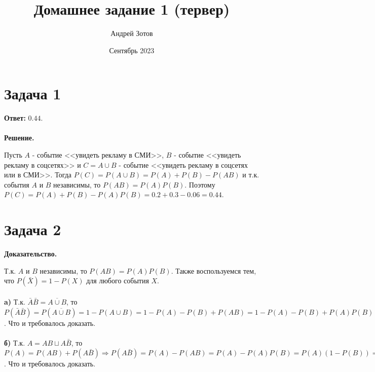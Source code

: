 \documentclass{article}
\title{Домашнее задание 1 (тервер)}
\author{Андрей Зотов}
\date{Сентябрь 2023}
\begin{document}
\maketitle

\section*{Задача 1}
{\bf Ответ: } $0.44$.
\\
\\
{\bf Решение.} 
\par
Пусть $A$ - событие <<увидеть рекламу в СМИ>>, $B$ - событие <<увидеть рекламу в соцсетях>> и $C = A\cup B$ - событие <<увидеть рекламу в соцсетях или в СМИ>>. Тогда $P(C)=P(A\cup B)=P(A)+P(B)-P(AB)$ и т.к. события $A$ и $B$ независимы, то $P(AB)=P(A)P(B)$. Поэтому $P(C)=P(A)+P(B)-P(A)P(B)=0.2+0.3-0.06=0.44$.
\section*{Задача 2}
{\bf Доказательство.}
\par
Т.к. $A$ и $B$ независимы, то $P(AB)=P(A)P(B)$. Также воспользуемся тем, что $P(\bar X)=1 - P(X)$ для любого события $X$.
\\
\\
{\bf a)} Т.к. $\bar A\bar B = \overline{A \cup B}$, то $P(\bar A\bar B)=P(\overline{A \cup B}) = 1 - P(A \cup B) = 1 - P(A) - P(B) + P(AB) = 1 - P(A) - P(B) + P(A)P(B)=(1-P(A))(1-P(B))=P(\bar A)P(\bar B)$. Что и требовалось доказать.
\\
\\
{\bf б)} Т.к. $A=AB\sqcup A\bar B$, то $P(A)=P(AB)+P(A\bar B)\Rightarrow P(A\bar B)=P(A)-P(AB)=P(A)-P(A)P(B)=P(A)(1-P(B))=P(A)P(\bar B)$. Что и требовалось доказать.
\end{document}
